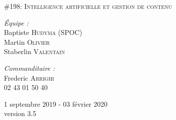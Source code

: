 \begin{titlepage}
\begin{center}
\vspace{0.4cm}
\textsc {\large \#198: Intelligence artificielle et gestion de contenu }\\[1.5cm]

\vspace{7cm}

\begin{minipage}{0.4\textwidth}
\begin{flushleft} \large
	\emph{Équipe :}\\
	Baptiste \textsc{Hudyma} (SPOC)\\
	Martin \textsc{Olivier}\\
	Staberlin \textsc{Valentain}
\end{flushleft}
\end{minipage}
\begin{minipage}{0.5\textwidth}
\begin{flushright} \large
	\emph{Commanditaire :}\\
	Frederic \textsc{Arrighi}\\
	02 43 01 50 40
\end{flushright}
\end{minipage}

\vfill

{\large 1\ier{} septembre 2019 - 03 février 2020}\\
{version 3.5}

\end{center}
\end{titlepage}
